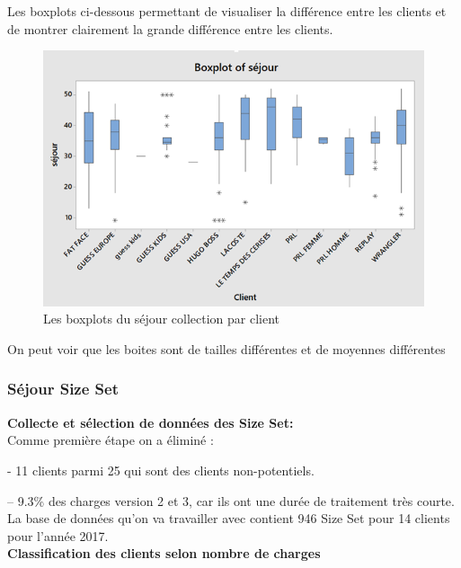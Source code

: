\documentclass[12pt, a4paper]{thesis}
\begin{document}
 
Les boxplots ci-dessous permettant de visualiser la différence entre les clients et de montrer clairement la grande différence entre les clients.
\begin{center}
\end{center}


\begin{figure}[!h]
\begin{center}
     \includegraphics[scale=0.8]{boxcoll.png}
\caption{Les boxplots du séjour collection par client}
\end{center}
\end{figure}

On peut voir que les boites sont de tailles différentes et de moyennes différentes




\subsubsection{Séjour Size Set}
\textbf{Collecte et sélection de données des Size Set:}\\
Comme première étape on a éliminé :
\item - 11 clients parmi 25 qui sont des clients non-potentiels.
\item – 9.3\% des charges version 2 et 3, car ils ont une durée de traitement très courte.
La base de données qu’on va travailler avec contient 946 Size Set pour 14 clients pour l’année 2017.\\


\textbf{Classification des clients selon nombre de charges}\\
\end{document}

